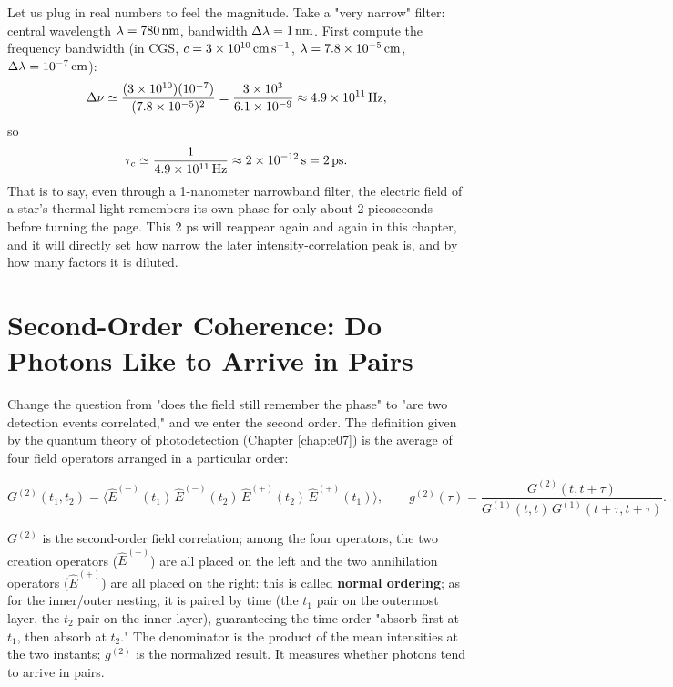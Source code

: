 Let us plug in real numbers to feel the magnitude. Take a "very narrow" filter: central wavelength \(\lambda=780\,{\rm nm}\), bandwidth \(\Delta\lambda=1\,{\rm nm}\). First compute the frequency bandwidth (in CGS, \(c=3\times10^{10}\,{\rm cm\,s^{-1}}\), \(\lambda=7.8\times10^{-5}\,{\rm cm}\), \(\Delta\lambda=10^{-7}\,{\rm cm}\)):
\[
  \Delta\nu\simeq\frac{(3\times10^{10})(10^{-7})}{(7.8\times10^{-5})^2}
  =\frac{3\times10^{3}}{6.1\times10^{-9}}
  \approx4.9\times10^{11}\,{\rm Hz},
\]
so
\[
  \tau_c\simeq\frac{1}{4.9\times10^{11}\,{\rm Hz}}\approx2\times10^{-12}\,{\rm s}=2\,{\rm ps}.
\]
That is to say, even through a 1-nanometer narrowband filter, the electric field of a star's thermal light remembers its own phase for only about 2 picoseconds before turning the page. This 2 ps will reappear again and again in this chapter, and it will directly set how narrow the later intensity-correlation peak is, and by how many factors it is diluted.

\section{Second-Order Coherence: Do Photons Like to Arrive in Pairs}
\label{sec:e08-g2}

Change the question from "does the field still remember the phase" to "are two detection events correlated," and we enter the second order. The definition given by the quantum theory of photodetection (Chapter \ref{chap:e07}) is the average of four field operators arranged in a particular order:

\begin{equation}
  G^{(2)}(t_1,t_2)=\big\langle
    \hat E^{(-)}(t_1)\,\hat E^{(-)}(t_2)\,\hat E^{(+)}(t_2)\,\hat E^{(+)}(t_1)
  \big\rangle,
  \qquad
  g^{(2)}(\tau)=\frac{G^{(2)}(t,t+\tau)}{G^{(1)}(t,t)\,G^{(1)}(t+\tau,t+\tau)} .
  \label{eq:e08-g2-field}
\end{equation}
\begin{formulaexplain}
\(G^{(2)}\) is the second-order field correlation; among the four operators, the two creation operators (\(\hat E^{(-)}\)) are all placed on the left and the two annihilation operators (\(\hat E^{(+)}\)) are all placed on the right: this is called \textbf{normal ordering}; as for the inner/outer nesting, it is paired by time (the \(t_1\) pair on the outermost layer, the \(t_2\) pair on the inner layer), guaranteeing the time order "absorb first at \(t_1\), then absorb at \(t_2\)." The denominator is the product of the mean intensities at the two instants; \(g^{(2)}\) is the normalized result. It measures whether photons tend to arrive in pairs.
\end{formulaexplain}

